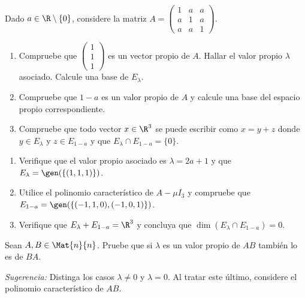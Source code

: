 \documentclass[10pt,a4]{examenEPN}
\begin{document}
\begin{preguntas}

\item Dado $a\in\R\setminus\{0\}$, considere la matriz $A = \begin{pmatrix}1&a&a\\a&1&a\\a&a&1\end{pmatrix}$.
\begin{enumerate}
    \item Compruebe que $\begin{pmatrix}1\\1\\1\end{pmatrix}$ es un vector propio de $A$. Hallar el valor propio $\lambda$ asociado. Calcule una base de $E_{\lambda}$.
    \item Compruebe que $1-a$ es un valor propio de $A$ y calcule una base del espacio propio correspondiente.
    \item Compruebe que todo vector $x\in\R^{3}$ se puede escribir como $x=y+z$ donde $y\in E_{\lambda}$ y $z\in E_{1-a}$ y que $E_{\lambda} \cap E_{1-a} = \{0\}$.
\end{enumerate}
    
\begin{respuesta}\hspace{0pt}

\begin{enumerate}
    \item Verifique que el valor propio asociado es $\lambda=2a+1$ y que $E_{\lambda}=\gen(\{(1,1,1)\})$.
    \item Utilice el polinomio característico de $A - \mu I_{3}$ y compruebe que $E_{1-a}=\gen(\{(-1,1,0),(-1,0,1)\})$.
    \item Verifique que $E_{\lambda} + E_{1-a} = \R^{3}$ y concluya que $\dim(E_{\lambda} \cap E_{1-a}) = 0$.\qedhere
\end{enumerate}
\end{respuesta}
\item Sean $A,B\in\Mat{n}{n}$. Pruebe que si $\lambda$ es un valor propio de $AB$ también lo es de $BA$.

\emph{Sugerencia:} Distinga los casos $\lambda\neq0$ y $\lambda=0$. Al tratar este último, considere el polinomio característico de $AB$.
    

\end{preguntas}
\end{document}
